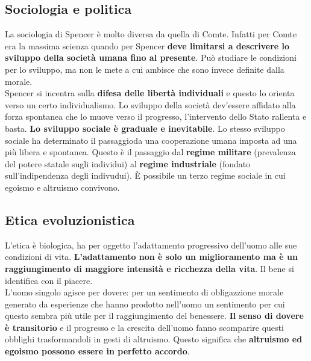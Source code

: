 \subsection{Sociologia e politica}
La sociologia di Spencer è molto diversa da quella di Comte. Infatti per Comte era la massima scienza
quando per Spencer \textbf{deve limitarsi a descrivere lo sviluppo della società umana fino al
presente}. Può studiare le condizioni per lo sviluppo, ma non le mete a cui ambisce che sono invece
definite dalla morale.\\ [\baselineskip]
Spencer si incentra sulla \textbf{difesa delle libertà individuali} e questo lo orienta verso un 
certo individualismo. Lo sviluppo della società dev'essere affidato alla forza spontanea che lo muove
verso il progresso, l'intervento dello Stato rallenta e basta. \textbf{Lo sviluppo sociale è graduale
e inevitabile}. Lo stesso sviluppo sociale ha determinato il passaggioda una cooperazione umana
imposta ad una più libera e spontanea. Questo è il passaggio dal \textbf{regime militare} (prevalenza
del potere statale sugli individui) al \textbf{regime industriale} (fondato sull'indipendenza degli
indivudui). È possibile un terzo regime sociale in cui egoismo e altruismo convivono. 

\subsection{Etica evoluzionistica}
L'etica è biologica, ha per oggetto l'adattamento progressivo dell'uomo alle sue condizioni di vita.
\textbf{L'adattamento non è solo un miglioramento ma è un raggiungimento di maggiore intensità e 
ricchezza della vita}. Il bene si identifica con il piacere.\\
L'uomo singolo agisce per dovere: per un sentimento di obligazzione morale generato da esperienze che
hanno prodotto nell'uomo un sentimento per cui questo sembra più utile per il raggiungimento del 
benessere. \textbf{Il senso di dovere è transitorio} e il progresso e la crescita dell'uomo fanno
scomparire questi obblighi trasformandoli in gesti di altruismo. Questo significa che 
\textbf{altruismo ed egoismo possono essere in perfetto accordo}. 
